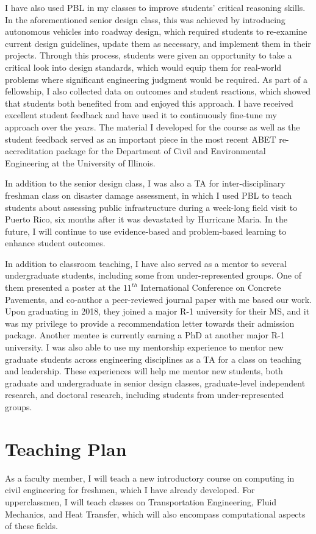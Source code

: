 \documentclass[12pt]{article}
\begin{document}
I have also used PBL in my classes to improve students' critical reasoning skills. In the aforementioned senior design class, this was achieved by introducing autonomous vehicles into roadway design, which required students to re-examine current design guidelines, update them as necessary, and implement them in their projects. Through this process, students were given an opportunity to take a critical look into design standards, which would equip them for real-world problems where significant engineering judgment would be required. As part of a fellowship, I also collected data on outcomes and student reactions, which showed that students both benefited from and enjoyed this approach. I have received excellent student feedback and have used it to continuously fine-tune my approach over the years. The material I developed for the course as well as the student feedback served as an important piece in the most recent ABET re-accreditation package for the Department of Civil and Environmental Engineering at the University of Illinois.

In addition to the senior design class, I was also a TA for inter-disciplinary freshman class on disaster damage assessment, in which I used PBL to teach students about assessing public infrastructure during a week-long field visit to Puerto Rico, six months after it was devastated by Hurricane Maria. In the future, I will continue to use evidence-based and problem-based learning to enhance student outcomes.

In addition to classroom teaching, I have also served as a mentor to several undergraduate students, including some from under-represented groups. One of them presented a poster at the $11^{th}$ International Conference on Concrete Pavements, and co-author a peer-reviewed journal paper with me based our work. Upon graduating in 2018, they joined a major R-1 university for their MS, and it was my privilege to provide a recommendation letter towards their admission package. Another mentee is currently earning a PhD at another major R-1 university. I was also able to use my mentorship experience to mentor new graduate students across engineering disciplines as a TA for a class on teaching and leadership. These experiences will help me mentor new students, both graduate and undergraduate in senior design classes, graduate-level independent research, and doctoral research, including students from under-represented groups.

\section*{Teaching Plan}
As a faculty member, I will teach a new introductory course on computing in civil engineering for freshmen, which I have already developed. For upperclassmen, I will teach classes on Transportation Engineering, Fluid Mechanics, and Heat Transfer, which will also encompass computational aspects of these fields. 
\end{document}
